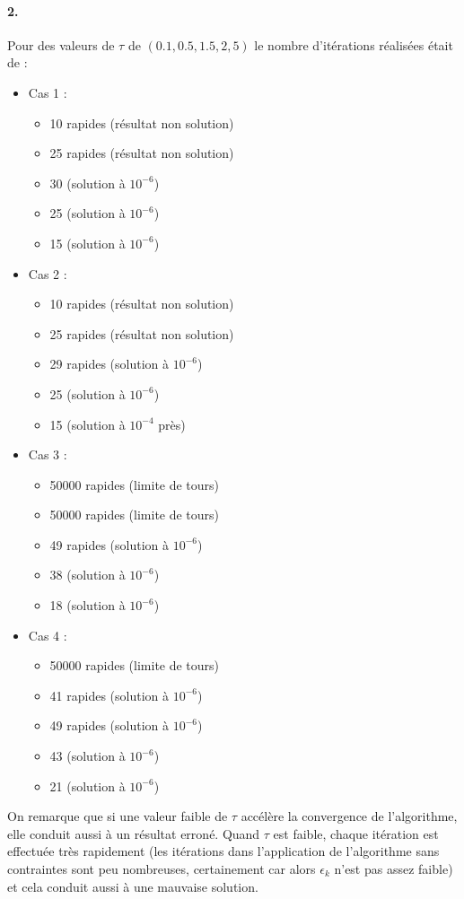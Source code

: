 \documentclass[12pt]{article}
\begin{document}
\paragraph{2.}
Pour des valeurs de $\tau$ de $(0.1, 0.5, 1.5, 2, 5)$ le nombre d'itérations réalisées était de :
\begin{itemize}
	\item Cas 1 :
		\begin{itemize}
			\item 10 rapides (résultat non solution)
			\item 25 rapides (résultat non solution)
			\item 30 (solution à $10^{-6}$)
			\item 25 (solution à $10^{-6}$)
			\item 15 (solution à $10^{-6}$)
		\end{itemize}
	\item Cas 2 :
		\begin{itemize}
			\item 10 rapides (résultat non solution)
			\item 25 rapides (résultat non solution)
			\item 29 rapides (solution à $10^{-6}$)
			\item 25 (solution à $10^{-6}$)
			\item 15 (solution à $10^{-4}$ près)
		\end{itemize}
	\item Cas 3 :
		\begin{itemize}
			\item 50000 rapides (limite de tours)
			\item 50000 rapides (limite de tours)
			\item 49 rapides (solution à $10^{-6}$)
			\item 38 (solution à $10^{-6}$)
			\item 18 (solution à $10^{-6}$)
		\end{itemize}
	\item Cas 4 :
		\begin{itemize}
			\item 50000 rapides (limite de tours)
			\item 41 rapides (solution à $10^{-6}$)
			\item 49 rapides (solution à $10^{-6}$)
			\item 43 (solution à $10^{-6}$)
			\item 21 (solution à $10^{-6}$)
		\end{itemize}
\end{itemize}
On remarque que si une valeur faible de $\tau$ accélère la convergence de l'algorithme, elle conduit aussi à un résultat erroné. Quand $\tau$ est faible, chaque itération est effectuée très rapidement (les itérations dans l'application de l'algorithme sans contraintes sont peu nombreuses, certainement car alors $\epsilon_k$ n'est pas assez faible) et cela conduit aussi à une mauvaise solution.
\end{document}
